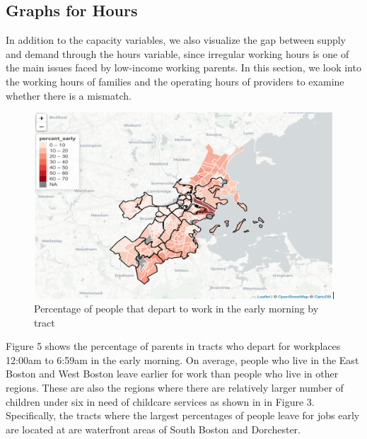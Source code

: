 \documentclass[10pt,letterpaper]{article}
\begin{document}
\subsection{Graphs for Hours}\label{graphs-for-hours}

In addition to the capacity variables, we also visualize the gap between
supply and demand through the hours variable, since irregular working
hours is one of the main issues faced by low-income working parents. In
this section, we look into the working hours of families and the
operating hours of providers to examine whether there is a mismatch.

\begin{figure}

{\centering \includegraphics[width=1\linewidth]{fig4} 

}

\caption{Percentage of people that depart to work in the early morning by tract}\label{fig:unnamed-chunk-11}
\end{figure}

Figure 5 shows the percentage of parents in tracts who depart for
workplaces 12:00am to 6:59am in the early morning. On average, people
who live in the East Boston and West Boston leave earlier for work than
people who live in other regions. These are also the regions where there
are relatively larger number of children under six in need of childcare
services as shown in in Figure 3. Specifically, the tracts where the
largest percentages of people leave for jobs early are located at are
waterfront areas of South Boston and Dorchester.
\end{document}
